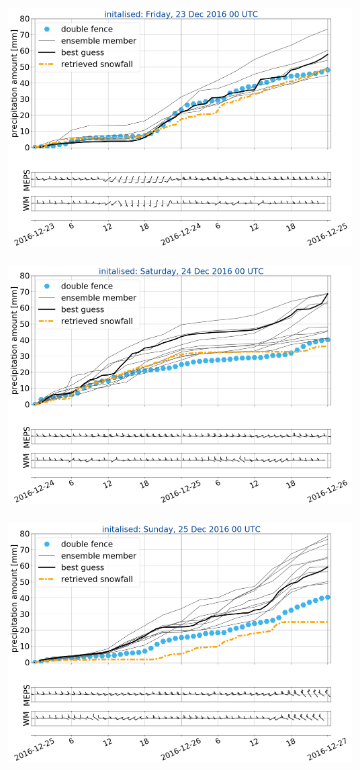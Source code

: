     \begin{figure}\ContinuedFloat
		\begin{subfigure}[b]{0.49\textwidth}
			\includegraphics[width=\textwidth]{./fig_sfc_acc/acc_wind_20161223_00}
			\caption{}\label{fig:sfc_acc23}
		\end{subfigure}
		\begin{subfigure}[b]{0.49\textwidth}
			\includegraphics[width=\textwidth]{./fig_sfc_acc/acc_wind_20161224_00}
			\caption{}\label{fig:sfc_acc24}
		\end{subfigure}
		\begin{subfigure}[b]{0.49\textwidth}
			\includegraphics[width=\textwidth]{./fig_sfc_acc/acc_wind_20161225_00}

\end{subfigure}
\end{figure}
